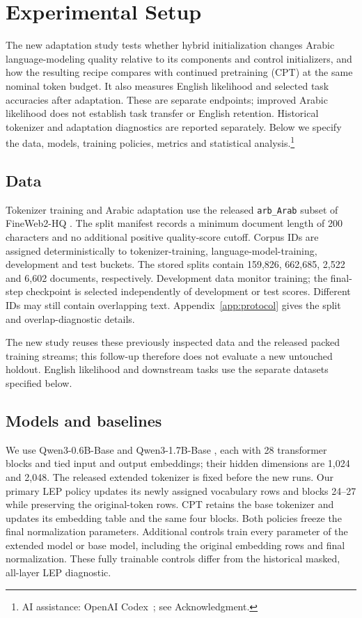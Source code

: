 \documentclass{ieeeaccess}
\begin{document}
\section{Experimental Setup}
\label{sec:experiments}

The new adaptation study tests whether hybrid initialization changes Arabic language-modeling quality relative to its components and control initializers, and how the resulting recipe compares with continued pretraining (CPT) at the same nominal token budget. It also measures English likelihood and selected task accuracies after adaptation. These are separate endpoints; improved Arabic likelihood does not establish task transfer or English retention. Historical tokenizer and adaptation diagnostics are reported separately. Below we specify the data, models, training policies, metrics and statistical analysis.\footnote{AI assistance: OpenAI Codex~\cite{openaicodex2026}; see Acknowledgment.}

\subsection{Data}
\label{sec:data}

Tokenizer training and Arabic adaptation use the released \texttt{arb\_Arab} subset of FineWeb2-HQ \cite{fineweb2hq_2025}. The split manifest records a minimum document length of 200 characters and no additional positive quality-score cutoff. Corpus IDs are assigned deterministically to tokenizer-training, language-model-training, development and test buckets. The stored splits contain 159{,}826, 662{,}685, 2{,}522 and 6{,}602 documents, respectively. Development data monitor training; the final-step checkpoint is selected independently of development or test scores. Different IDs may still contain overlapping text. Appendix~\ref{app:protocol} gives the split and overlap-diagnostic details.

The new study reuses these previously inspected data and the released packed training streams; this follow-up therefore does not evaluate a new untouched holdout. English likelihood and downstream tasks use the separate datasets specified below.

\subsection{Models and baselines}

We use Qwen3-0.6B-Base and Qwen3-1.7B-Base \cite{qwen3technicalreport}, each with 28 transformer blocks and tied input and output embeddings; their hidden dimensions are 1{,}024 and 2{,}048. The released extended tokenizer is fixed before the new runs. Our primary LEP policy updates its newly assigned vocabulary rows and blocks 24--27 while preserving the original-token rows. CPT retains the base tokenizer and updates its embedding table and the same four blocks. Both policies freeze the final normalization parameters. Additional controls train every parameter of the extended model or base model, including the original embedding rows and final normalization. These fully trainable controls differ from the historical masked, all-layer LEP diagnostic.
\end{document}
